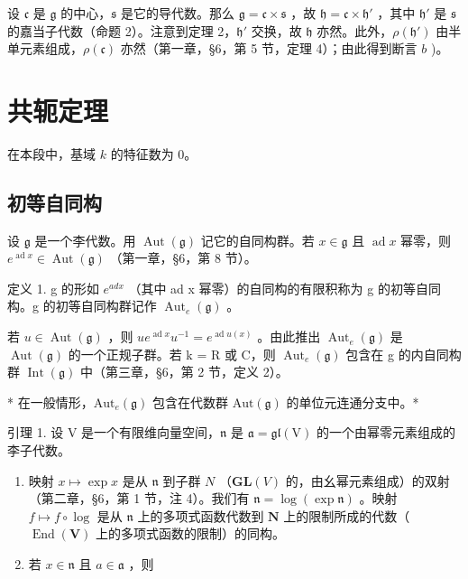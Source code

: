 设 \(\mathfrak{c}\) 是 \(\mathfrak{g}\) 的中心，\(\mathfrak{s}\) 是它的导代数。那么 \(\mathfrak{g} = \mathfrak{c} \times \mathfrak{s}\) ，故 \(\mathfrak{h} = \mathfrak{c} \times \mathfrak{h}'\) ，其中 \(\mathfrak{h}'\) 是 \(\mathfrak{s}\) 的嘉当子代数（命题 2）。注意到定理 2，\(\mathfrak{h}'\) 交换，故 \(\mathfrak{h}\) 亦然。此外，\(\rho(\mathfrak{h}')\) 由半单元素组成，\(\rho(\mathfrak{c})\) 亦然（第一章，§6，第 5 节，定理 4）；由此得到断言 \(b\) )。

\section{共轭定理}

在本段中，基域 \(k\) 的特征数为 0。

\subsection{初等自同构}

设 \(\mathfrak{g}\) 是一个李代数。用 \(\operatorname{Aut}(\mathfrak{g})\) 记它的自同构群。若 \(x \in \mathfrak{g}\) 且 \(\operatorname{ad} x\) 幂零，则 \(e^{\operatorname{ad} x} \in \operatorname{Aut}(\mathfrak{g})\) （第一章，§6，第 8 节）。

定义 1. g 的形如 \(e^{ad x}\) （其中 ad x 幂零）的自同构的有限积称为 g 的初等自同构。g 的初等自同构群记作 \(\operatorname{Aut}_{e}(\mathfrak{g})\) 。

若 \(u \in \operatorname{Aut}(\mathfrak{g})\) ，则 \(ue^{\operatorname{ad}x}u^{-1} = e^{\operatorname{ad}u(x)}\) 。由此推出 \(\operatorname{Aut}_{e}(\mathfrak{g})\) 是 \(\operatorname{Aut}(\mathfrak{g})\) 的一个正规子群。若 k = R 或 C，则 \(\operatorname{Aut}_{e}(\mathfrak{g})\) 包含在 g 的内自同构群 \(\operatorname{Int}(\mathfrak{g})\) 中（第三章，§6，第 2 节，定义 2）。

* 在一般情形，\(\mathrm{Aut}_e(\mathfrak{g})\) 包含在代数群 \(\mathrm{Aut}(\mathfrak{g})\) 的单位元连通分支中。*

引理 1. 设 \(\mathrm{V}\) 是一个有限维向量空间，\(\mathfrak{n}\) 是 \(\mathfrak{a} = \mathfrak{gl}(\mathrm{V})\) 的一个由幂零元素组成的李子代数。

\begin{enumerate}
\def\labelenumi{(\roman{enumi})}
\item
  映射 \(x \mapsto \exp x\) 是从 \(\mathfrak{n}\) 到子群 \(N\) （\(\mathbf{GL}(V)\) 的，由幺幂元素组成）的双射（第二章，§6，第 1 节，注 4）。我们有 \(\mathfrak{n} = \log(\exp \mathfrak{n})\) 。映射 \(f \mapsto f \circ \log\) 是从 \(\mathfrak{n}\) 上的多项式函数代数到 \(\mathbf{N}\) 上的限制所成的代数（\(\operatorname{End}(\mathbf{V})\) 上的多项式函数的限制）的同构。
\item
  若 \(x \in \mathfrak{n}\) 且 \(a \in \mathfrak{a}\) ，则
\end{enumerate}


